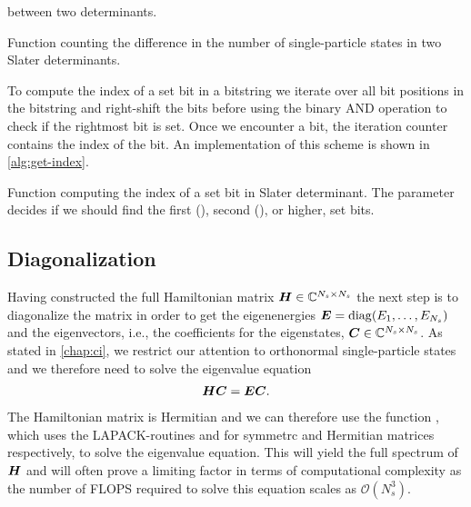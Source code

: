            between two determinants.
            \begin{algorithm}
                \caption{Function counting the difference in the number of
                single-particle states in two Slater determinants.}
                \label{alg:state-diff}
            \end{algorithm}
            To compute the index of a set bit in a bitstring we iterate over all
            bit positions in the bitstring and right-shift the bits before using
            the binary AND operation to check if the rightmost bit is set.
            Once we encounter a bit, the iteration counter contains the index of
            the bit.
            An implementation of this scheme is shown in
            \autoref{alg:get-index}.
            \begin{algorithm}
                \caption{Function computing the index of a set bit in Slater
                determinant.
                The parameter  decides if we should find the
                first (), second (), or higher, set bits.}
                \label{alg:get-index}
            \end{algorithm}


        \subsection{Diagonalization}
            Having constructed the full Hamiltonian matrix $\boldsymbol{H} \in
            \mathbb{C}^{N_s \times N_s}$ the next step is to diagonalize the
            matrix in order to get the eigenenergies $\boldsymbol{E} = \operatorname{diag}(E_1,
            \dots, E_{N_s})$ and the eigenvectors, i.e., the coefficients for
            the eigenstates, $\boldsymbol{C} \in \mathbb{C}^{N_s \times N_s}$.
            As stated in \autoref{chap:ci}, we restrict our attention to
            orthonormal single-particle states and we therefore need to solve
            the eigenvalue equation
            \begin{align}
                \boldsymbol{H}\boldsymbol{C} = \boldsymbol{E}\boldsymbol{C}.
            \end{align}
            The Hamiltonian matrix is Hermitian and we can therefore use the
            function  \cite{numpy}, which uses the
            LAPACK-routines \cite{laug}  and  for
            symmetrc and Hermitian matrices respectively, to solve the
            eigenvalue equation.
            This will yield the full spectrum of $\boldsymbol{H}$ and will often
            prove a limiting factor in terms of computational complexity as the
            number of FLOPS required to solve this equation scales as
            $\mathcal{O}(N_s^3)$.

